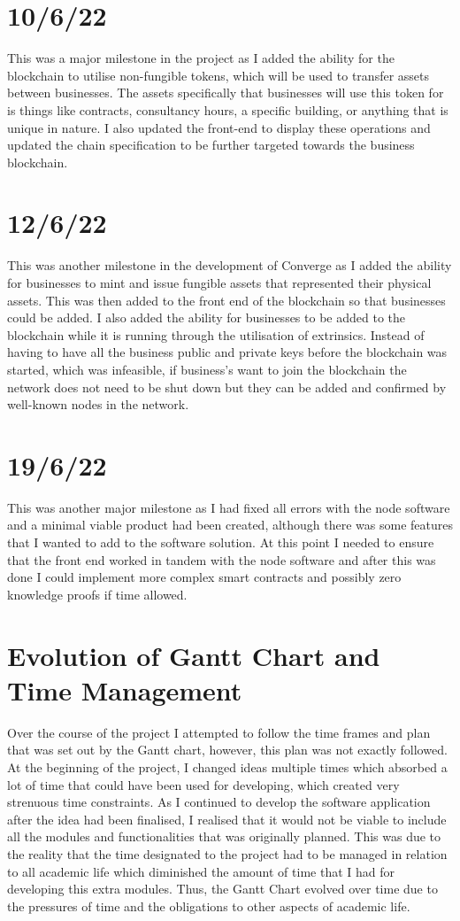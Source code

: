 \section{10/6/22}
This was a major milestone in the project as I added the ability for the blockchain to utilise non-fungible tokens, which will be used to transfer assets between businesses. The assets specifically that businesses will use this token for is things like contracts, consultancy hours, a specific building, or anything that is unique in nature. I also updated the front-end to display these operations and updated the chain specification to be further targeted towards the business blockchain. \\
\section{12/6/22}
This was another milestone in the development of Converge as I added the ability for businesses to mint and issue fungible assets that represented their physical assets. This was then added to the front end of the blockchain so that businesses could be added. I also added the ability for businesses to be added to the blockchain while it is running through the utilisation of extrinsics. Instead of having to have all the business public and private keys before the blockchain was started, which was infeasible, if business’s want to join the blockchain the network does not need to be shut down but they can be added and confirmed by well-known nodes in the network. 
\section{19/6/22}
This was another major milestone as I had fixed all errors with the node software and a minimal viable product had been created, although there was some features that I wanted to add to the software solution. At this point I needed to ensure that the front end worked in tandem with the node software and after this was done I could implement more complex smart contracts and possibly zero knowledge proofs if time allowed.

\section{Evolution of Gantt Chart and Time Management}
Over the course of the project I attempted to follow the time frames and plan that was set out by the Gantt chart, however, this plan was not exactly followed. At the beginning of the project, I changed ideas multiple times which absorbed a lot of time that could have been used for developing, which created very strenuous time constraints. As I continued to develop the software application after the idea had been finalised, I realised that it would not be viable to include all the modules and functionalities that was originally planned. This was due to the reality that the time designated to the project had to be managed in relation to all academic life which diminished the amount of time that I had for developing this extra modules. Thus, the Gantt Chart evolved over time due to the pressures of time and the obligations to other aspects of academic life.

